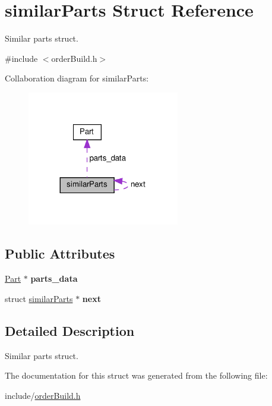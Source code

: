 \hypertarget{structsimilarParts}{}\section{similar\+Parts Struct Reference}
\label{structsimilarParts}


Similar parts struct.  




{\ttfamily \#include $<$order\+Build.\+h$>$}



Collaboration diagram for similar\+Parts\+:\nopagebreak
\begin{figure}[H]
\begin{center}
\leavevmode
\includegraphics[width=188pt]{structsimilarParts__coll__graph}
\end{center}
\end{figure}
\subsection*{Public Attributes}
\begin{DoxyCompactItemize}
\item 
\mbox{\label{structsimilarParts_a3f437349183287ca08b62bd3754c111c}} 
\hyperlink{structPart}{Part} $\ast$ {\bfseries parts\+\_\+data}
\item 
\mbox{\label{structsimilarParts_a715b323f6b367ed6b401279a9f68a090}} 
struct \hyperlink{structsimilarParts}{similar\+Parts} $\ast$ {\bfseries next}
\end{DoxyCompactItemize}


\subsection{Detailed Description}
Similar parts struct. 

The documentation for this struct was generated from the following file\+:\begin{DoxyCompactItemize}
\item 
include/\hyperlink{orderBuild_8h}{order\+Build.\+h}\end{DoxyCompactItemize}
